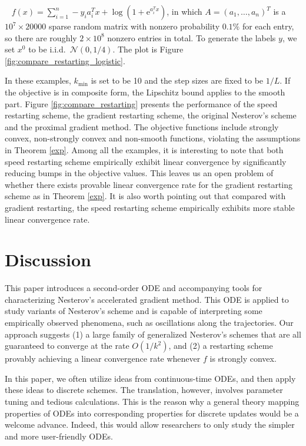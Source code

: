 \documentclass[twoside,11pt]{article}
\def\iid{\textrm{i.i.d.~}}
\begin{document}
\vspace{0.4em}
~ $f(x) = \sum_{i=1}^n - y_i a_i^T x + \log(1 + \mathrm{e}^{a_i^T x})$, in which $A = (a_1, \ldots, a_n)^T$ is a $10^7 \times 20000$ sparse random matrix with nonzero probability $0.1\%$ for each entry, so there are roughly $2 \times 10^8$ nonzero entries in total. To generate the labels $y$, we set $x^0$ to be \iid $\mathcal{N}(0, 1/4)$. The plot is Figure \ref{fig:compare_restarting_logistic}.


In these examples, $k_{\min}$ is set to be 10 and the step sizes are fixed to be $1/L$. If the objective is in composite form,  the Lipschitz bound applies to the smooth part. Figure \ref{fig:compare_restarting} presents the performance of the speed restarting scheme, the gradient restarting scheme, the original Nesterov's scheme and the proximal gradient method. The objective functions include strongly convex, non-strongly convex and non-smooth functions, violating the assumptions in Theorem \ref{exp}. Among all the examples, it is interesting to note that both speed restarting scheme empirically exhibit linear convergence by significantly reducing bumps in the objective values. This leaves us an open problem of whether there exists provable linear convergence rate for the gradient restarting scheme as in Theorem \ref{exp}. It is also worth pointing out that compared with gradient restarting, the speed restarting scheme empirically exhibits more stable linear convergence rate.





\section{Discussion}
This paper introduces a second-order ODE and accompanying tools for characterizing Nesterov's accelerated gradient method. This ODE is applied to study variants of Nesterov's scheme and is capable of interpreting some empirically observed phenomena, such as oscillations along the trajectories. Our approach suggests (1) a large family of generalized Nesterov's schemes that are all guaranteed to converge at the rate $O(1/k^2)$, and (2) a restarting scheme provably achieving a linear convergence rate whenever $f$ is strongly convex.

In this paper, we often utilize ideas from continuous-time ODEs, and then apply these ideas to discrete schemes. The translation, however, involves parameter tuning and tedious calculations. This is the reason why a general theory mapping properties of ODEs into corresponding properties for discrete updates would be a welcome advance. Indeed, this would allow researchers to only study the simpler and more user-friendly ODEs. 
\end{document}

